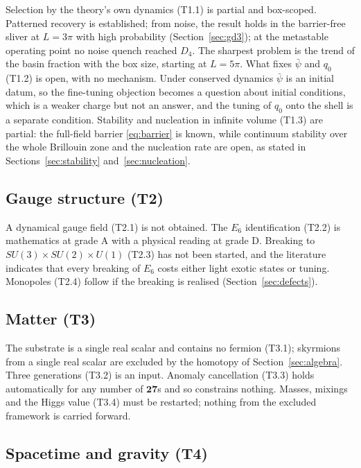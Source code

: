 \documentclass[a4paper,11pt]{article}
\numberwithin{equation}{section}
\theoremstyle{jsplain}
\theoremstyle{jsrem}
\begin{document}
Selection by the theory's own dynamics (T1.1) is partial and box-scoped. Patterned recovery is established; from noise, the result holds in the barrier-free sliver at $L=3\pi$ with high probability (Section~\ref{sec:gd3}); at the metastable operating point no noise quench reached $D_4$. The sharpest problem is the trend of the basin fraction with the box size, starting at $L=5\pi$. What fixes $\bar\psi$ and $q_0$ (T1.2) is open, with no mechanism. Under conserved dynamics $\bar\psi$ is an initial datum, so the fine-tuning objection becomes a question about initial conditions, which is a weaker charge but not an answer, and the tuning of $q_0$ onto the shell is a separate condition. Stability and nucleation in infinite volume (T1.3) are partial: the full-field barrier \eqref{eq:barrier} is known, while continuum stability over the whole Brillouin zone and the nucleation rate are open, as stated in Sections~\ref{sec:stability} and~\ref{sec:nucleation}.

\subsection{Gauge structure (T2)}

A dynamical gauge field (T2.1) is not obtained. The $E_6$ identification (T2.2) is mathematics at grade A with a physical reading at grade D. Breaking to $SU(3)\times SU(2)\times U(1)$ (T2.3) has not been started, and the literature indicates that every breaking of $E_6$ costs either light exotic states or tuning. Monopoles (T2.4) follow if the breaking is realised (Section~\ref{sec:defects}).

\subsection{Matter (T3)}

The substrate is a single real scalar and contains no fermion (T3.1); skyrmions from a single real scalar are excluded by the homotopy of Section~\ref{sec:algebra}. Three generations (T3.2) is an input. Anomaly cancellation (T3.3) holds automatically for any number of $\mathbf{27}$s and so constrains nothing. Masses, mixings and the Higgs value (T3.4) must be restarted; nothing from the excluded framework is carried forward.

\subsection{Spacetime and gravity (T4)}
\end{document}
